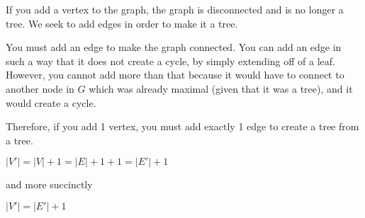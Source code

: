 \documentclass[11pt,letterpaper]{article}
\begin{document}
If you add a vertex to the graph, the graph is disconnected and is no longer a tree. We seek to add edges in order to make it a tree.

You must add an edge to make the graph connected. You can add an edge in such a way that it does not create
a cycle, by simply extending off of a leaf. However, you cannot add more than that because it would have to connect
to another node in $G$ which was already maximal (given that it was a tree), and it would create a cycle.

Therefore, if you add 1 vertex, you must add exactly 1 edge to create a tree from a tree.

$|V'| = |V| + 1 = |E| + 1 + 1 = |E'| + 1$

and more succinctly

$|V'| = |E'| + 1$
\end{document}
